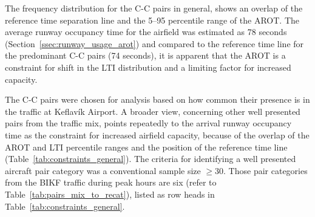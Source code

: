 The frequency distribution for the C-C pairs in general, shows an overlap of the reference time separation line and the 5--95 percentile range of the AROT. The average runway occupancy time for the airfield was estimated as 78 seconds (Section~\ref{ssec:runway_usage_arot}) and compared to the reference time line for the predominant C-C pairs (74 seconds), it is apparent that the AROT is a constraint for shift in the LTI distribution and a limiting factor for increased capacity.

The C-C pairs were chosen for analysis based on how common their presence is in the traffic at Keflavík Airport. A broader view, concerning other well presented pairs from the traffic mix, points repeatedly to the arrival runway occupancy time as the constraint for increased airfield capacity, because of the overlap of the AROT and LTI percentile ranges and the position of the reference time line (Table~\ref{tab:constraints_general}). The criteria for identifying a well presented aircraft pair category was a conventional sample size $\geq30$. Those pair categories from the BIKF traffic during peak hours are six (refer to Table~\ref{tab:pairs_mix_to_recat}), listed as row heads in Table~\ref{tab:constraints_general}. 

